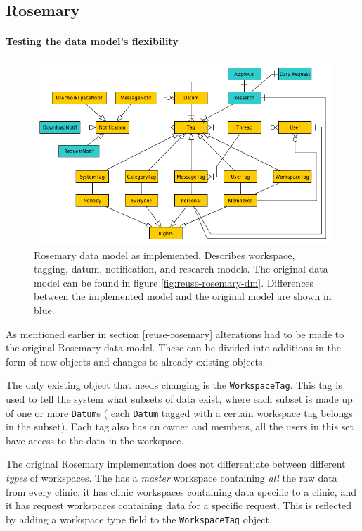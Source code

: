 \subsection{Rosemary}

\paragraph{Testing the data model's flexibility}
\begin{figure}[!b]
	\centering
	\includegraphics[width=1.0\linewidth]{images/datamodel-adapted}
	\caption{
		Rosemary data model as implemented.
		Describes workspace, tagging, datum, notification, and research models.
		The original data model can be found in figure \ref{fig:reuse-rosemary-dm}.
		Differences between the implemented model and the original model are shown in blue.
	}
	\label{fig:implementation-rosemary-dm}
\end{figure}

As mentioned earlier in section \ref{reuse-rosemary} alterations had to be made to the original Rosemary data model.
These can be divided into additions in the form of new objects and changes to already existing objects.

The only existing object that needs changing is the {\tt WorkspaceTag}.
This tag is used to tell the system what subsets of data exist, where each subset is made up of one or more {\tt Datum}s (\ie{} each {\tt Datum} tagged with a certain workspace tag belongs in the subset).
Each tag also has an owner and members, all the users in this set have access to the data in the workspace.

The original Rosemary implementation does not differentiate between different \emph{types} of workspaces. 
The \ivfsystem{} has a \emph{master} workspace containing \emph{all} the raw data from every clinic, it has clinic workspaces containing data specific to a clinic, and it has request workspaces containing data for a specific request.
This is reflected by adding a workspace type field to the {\tt WorkspaceTag} object.

